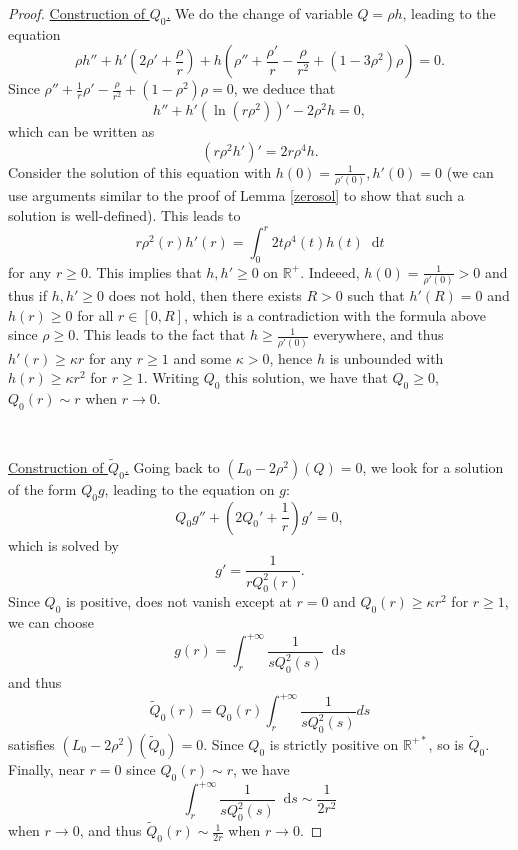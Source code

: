 \documentclass[11 pt]{amsart}
\newcommand{\tmem}{\underline}
\theoremstyle{definition}
\theoremstyle{remark}
\numberwithin{equation}{section}
\newcommand{\dd}{\mathop{}\!\mathrm{d}}
\begin{document}
\begin{proof}
  {\tmem{Construction of $Q_0${\tmem{}}.}} We do the change of variable $Q = \rho h$, leading to the equation
  \[ \rho h'' + h' \left( 2 \rho' + \frac{\rho}{r} \right) + h \left( \rho'' +
     \frac{\rho'}{r} - \frac{\rho}{r^2} + (1 - 3 \rho^2) \rho \right) = 0. \]
  Since $\rho'' + \frac{1}{r} \rho' - \frac{\rho}{r^2} + (1 - \rho^2) \rho =
  0$, we deduce that
  \[ h'' + h' (\ln (r \rho^2))' - 2 \rho^2 h = 0, \]
  which can be written as
  \begin{equation}
    (r \rho^2 h')' = 2 r \rho^4 h. \label{freedfromdesire}
  \end{equation}
  Consider the solution of this equation with $h (0) = \frac{1}{\rho' (0)}, h'
  (0) = 0$ (we can use arguments similar to the proof of Lemma \ref{zerosol} to show
  that such a solution is well-defined). This leads to
  \[ r \rho^2 (r) h' (r) = \int_0^r 2 t \rho^4 (t) h (t)\dd t  \]
  for any $r \geqslant 0$. This implies that $h, h' \geqslant 0$ on
  $\mathbb{R}^+$. Indeeed, $h (0) = \frac{1}{\rho' (0)} > 0$ and thus if $h,
  h' \geqslant 0$ does not hold, then there exists $R > 0$ such that $h' (R) =
  0$ and $h (r) \geqslant 0$ for all $r \in [0, R]$, which is a contradiction
  with the formula above since $\rho \geqslant 0$. This leads to the fact that
  $h \geqslant \frac{1}{\rho' (0)}$ everywhere, and thus $h' (r) \geqslant
  \kappa r$ for any $r \geqslant 1$ and some $\kappa > 0$, hence $h$ is
  unbounded with $h (r) \geqslant \kappa r^2$ for $r \geqslant 1$. Writing
  $Q_0$ this solution, we have that $Q_0 \geqslant 0$, $Q_0 (r) \sim r$ when
  $r \rightarrow 0$.
  
  \

\noindent
  {\tmem{Construction of $\widetilde{Q}_0$.}}
Going back to $(L_0 - 2 \rho^2) (Q) = 0$, we look for a solution of the
  form $Q_0 g$, leading to the equation on $g$:
  \[ Q_0 g'' + \left( 2 Q_0' + \frac{1}{r} \right) g' = 0, \]
  which is solved by
  \[ g' = \frac{1}{r Q_0^2 (r)} . \]
  Since $Q_0$ is positive, does not vanish except at $r = 0$ and $Q_0 (r)
  \geqslant \kappa r^2$ for $r \geqslant 1$, we can choose
  \[ g (r) = \int_r^{+ \infty} \frac{1}{s Q_0^2 (s)}\dd s\]
  and thus
  \[ \widetilde{Q}_0 (r) = Q_0 (r) \int_r^{+ \infty} \frac{1}{s Q_0^2 (s)} d
     s \]
  satisfies $(L_0 - 2 \rho^2) (\widetilde{Q}_0) = 0$. Since $Q_0$ is strictly
  positive on $\mathbb{R}^{+ \ast}$, so is $\widetilde{Q}_0$. Finally, near $r =
  0$ since $Q_0 (r) \sim r$, we have
  \[ \int_r^{+ \infty} \frac{1}{s Q_0^2 (s)}\dd s\sim \frac{1}{2 r^2} \]
  when $r \rightarrow 0$, and thus $\widetilde{Q}_0 (r) \sim \frac{1}{2 r}$ when
  $r \rightarrow 0$.
  

\end{proof}
\end{document}
